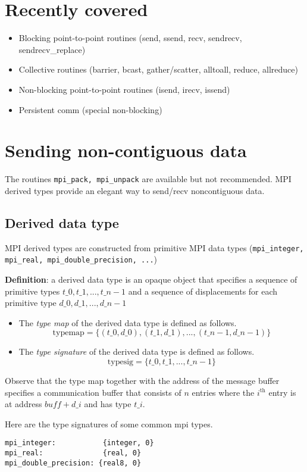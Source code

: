 \documentclass[10pt]{article}
\newenvironment{mitemize}
{
  \begin{itemize}
  \setlength{\itemsep}{1pt}
  \setlength{\parskip}{0pt}
  \setlength{\parsep}{0pt}}{\end{itemize}
}
\begin{document}
\section*{Recently covered}
\begin{mitemize}
  \item Blocking point-to-point routines (send, ssend, recv, sendrecv, sendrecv\_replace)
  \item Collective routines (barrier, bcast, gather/scatter, alltoall, reduce, allreduce)
  \item Non-blocking point-to-point routines (isend, irecv, issend)
  \item Persistent comm (special non-blocking)
\end{mitemize}

\section*{Sending non-contiguous data}
The routines \texttt{mpi\_pack, mpi\_unpack} are available but not recommended. MPI derived types provide an elegant way to send/recv noncontiguous data.

\subsection*{Derived data type}
MPI derived types are constructed from primitive MPI data types (\texttt{mpi\_integer, mpi\_real, mpi\_double\_precision, ...})

\textbf{Definition}: a derived data type is an opaque object that specifies a sequence of primitive types $t\_0, t\_1, ..., t\_{n-1}$ and a sequence of displacements for each primitive type $d\_0, d\_1, ..., d\_{n-1}$
\begin{mitemize}
  \item The \textit{type map} of the derived data type is defined as follows. \[ \text{typemap} = \{ (t\_0, d\_0), (t\_1, d\_1), ..., (t\_{n-1}, d\_{n-1}) \} \]
  \item The \textit{type signature} of the derived data type is defined as follows. \[ \text{typesig} = \{ t\_0, t\_1, ..., t\_{n-1} \} \]
\end{mitemize}

Observe that the type map together with the address of the message buffer specifies a communication buffer that consists of $n$ entries where the $i^{\text{th}}$ entry is at address $buff + d\_i$ and has type $t\_i$.
  
Here are the type signatures of some common mpi types.
\begin{verbatim}
mpi_integer:           {integer, 0}
mpi_real:              {real, 0}
mpi_double_precision: {real8, 0}
\end{verbatim}
  
\end{document}
